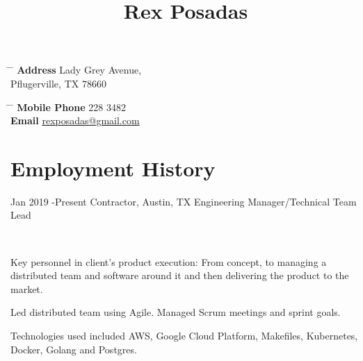 \documentclass[10pt]{article} %
\begin{document}

\title{Rex Posadas} %


\parbox{0.5\textwidth}{ %
\begin{tabbing} %
\hspace{3cm} \= \hspace{4cm} \= \kill %
{\bf Address}  Lady Grey Avenue,\\ %
\> Pflugerville, TX  78660 \\ %
\end{tabbing}}
\hfill %
\parbox{0.5\textwidth}{ %
\begin{tabbing} %
\hspace{3cm} \= \hspace{4cm} \= \kill %
{\bf Mobile Phone}  228 3482 \\ %
{\bf Email} \> \href{mailto:rexposadas@gmail.com}{rexposadas@gmail.com} \\ %
\end{tabbing}}




\section{Employment History}

\job
{Jan 2019 -}{Present}
{Contractor, Austin, TX}
{}
{Engineering Manager/Technical Team Lead}
{\\

\begin{itemize-noindent}
\item{Key personnel in client's product execution: From concept, to managing a distributed team and software around it and then delivering the product to the market.}
\item{Led distributed team using Agile. Managed Scrum meetings and sprint goals.}
\item{Technologies used included AWS, Google Cloud Platform, Makefiles, Kubernetes, Docker, Golang and Postgres.}
\end{itemize-noindent}
}
\end{document}

